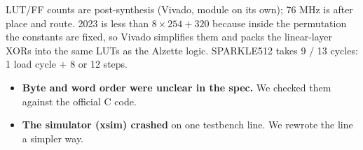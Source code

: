 \documentclass[10pt]{article}
\newcommand{\sect}[1]{\vspace{1pt}{\large\bfseries #1}\par}
\begin{document}
{\small LUT/FF counts are post-synthesis (Vivado, module on its own); 76 MHz is after place and route. 2023 is less than
$8\times254+320$ because inside the permutation the constants are fixed, so Vivado simplifies them
and packs the linear-layer XORs into the same LUTs as the Alzette logic.
SPARKLE512 takes 9 / 13 cycles: 1 load cycle + 8 or 12 steps.}

\sect{Challenges and how we solved them}
\begin{itemize}
\item \textbf{Byte and word order were unclear in the spec.} We checked them against the official C code.
\item \textbf{The simulator (xsim) crashed} on one testbench line. We rewrote the line a simpler way.
\end{itemize}
\end{document}
